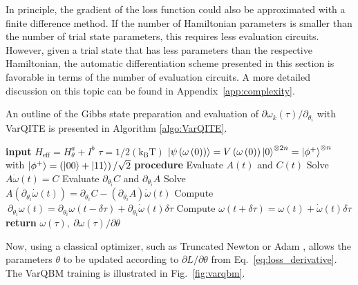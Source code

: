 \documentclass[twocolumn, aps, pra, superscriptaddress, floatfix]{revtex4}
\newcommand{\varqbm}{VarQBM}
\begin{document}
In principle, the gradient of the loss function could also be approximated with a finite difference method. If the number of Hamiltonian parameters is smaller than the number of trial state parameters, this requires less evaluation circuits. However, given a trial state that has less parameters than the respective Hamiltonian, the automatic differentiation scheme presented in this section is favorable in terms of the number of evaluation circuits.
A more detailed discussion on this topic can be found in Appendix~\ref{app:complexity}.

An outline of the Gibbs state preparation and evaluation of ${\partial \omega_k\left(\tau \right)}/{\partial_{\theta_i}}$ with VarQITE is presented in Algorithm \ref{algo:VarQITE}.

\begin{algorithm}
 \caption{VarQITE for \varqbm} \label{algo:VarQITE}
\begin{algorithmic}[0]
    \State  \textbf{input}
    \State $H_{\text{eff}} = H_{\theta}^a + I^b$
	\State$\tau = {1}/{2\left(\text{k}_{\text{B}}\text{T}\right)}$
	\State $\ket{\psi\left( \omega\left(0\right)\right)} = V\left(\omega\left(0\right)\right)\ket{0}^{\otimes 2n} = \ket{\phi^{+}}^{\otimes n}$
	\State with $\ket{\phi^{+}} = \left(\ket{00}+\ket{11}\right)/{\sqrt{2}}$
    \State \textbf{procedure}
		\State Evaluate $A\left(t\right)$ and $C\left(t\right)$
		\State Solve $A\dot{\omega}\left(t\right) = C$
    			\State Evaluate $\partial_{\theta_i}C$ and $\partial_{\theta_i}A$
    			\State \label{item:linEqDer}Solve $A\left(\partial_{\theta_i}\dot{\omega}\left(t\right)\right)  = \partial_{\theta_i}C - \left(\partial_{\theta_i}A\right)\dot{\omega}\left(t\right)$
    			\State \label{item:grad_omega_tau}Compute $ \: \partial_{\theta_i}{\omega}\left(t\right) = \partial_{\theta_i}{\omega}\left(t-\delta\tau\right)+\partial_{\theta_i}\dot{\omega}\left(t\right)\delta\tau$
	   \EndFor
		\State \label{item:computeUpdateDer}Compute $\omega\left(t+\delta\tau\right) = \omega\left(t\right) +   \dot{\omega}\left(t\right)\delta\tau $
	\EndFor
	\State \textbf{return} $\omega\left(\tau\right), \: \partial\omega\left(\tau\right)/\partial\theta$
\end{algorithmic}
\end{algorithm}

Now, using a classical optimizer, such as Truncated Newton \cite{TNCDembo1983} or Adam \cite{Kingmaadam14}, allows the parameters $\theta$ to be updated according to ${\partial L}/{\partial\theta}$ from Eq.~\eqref{eq:loss_derivative}.
The \varqbm{} training is illustrated in Fig.~\ref{fig:varqbm}.
\end{document}
